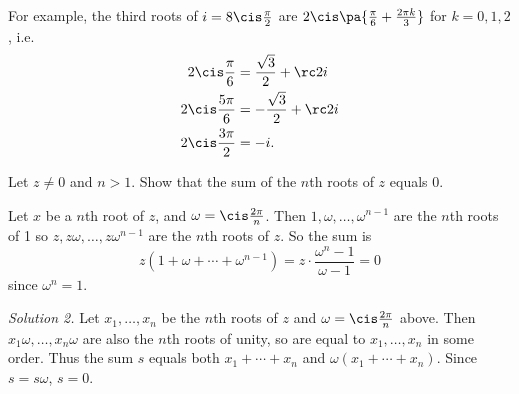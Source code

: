 For example, the third roots of $i=8\cis \frac{\pi}{2}$ are $2\cis \pa{\frac{\pi}{6}+\frac{2\pi k}{3}}$ for $k=0,1,2$, i.e.
\begin{align*}
2\cis \frac{\pi}{6}&=\frac{\sqrt{3}}{2}+\rc 2 i\\
2\cis \frac{5\pi}{6}&=-\frac{\sqrt{3}}{2}+\rc 2 i\\
2\cis \frac{3\pi}{2}&=-i.
\end{align*}

\begin{ex}\label{sumroot}
Let $z\neq 0$ and $n>1$. Show that the sum of the $n$th roots of $z$ equals 0.
\end{ex}
 Let $x$ be a $n$th root of $z$, and $\omega=\cis \frac{2\pi}{n}$. Then $1,\omega,\ldots, \omega^{n-1}$ are the $n$th roots of 1 so $z,z\omega,\ldots, z\omega^{n-1}$ are the $n$th roots of $z$. So the sum is
\[z(1+\omega+\cdots +\omega^{n-1})=z\cdot \frac{\omega^n-1}{\omega-1}=0\]
since $\omega^n=1$.

{\it Solution 2.} Let $x_1,\ldots, x_n$ be the $n$th roots of $z$ and $\omega=\cis \frac{2\pi}{n}$ above. Then $x_1\omega,\ldots, x_n\omega$ are also the $n$th roots of unity, so are equal to $x_1,\ldots, x_n$ in some order. Thus the sum $s$ equals both $x_1+\cdots +x_n$ and $\omega(x_1+\cdots+ x_n)$. Since $s=s\omega$, $s=0$.

